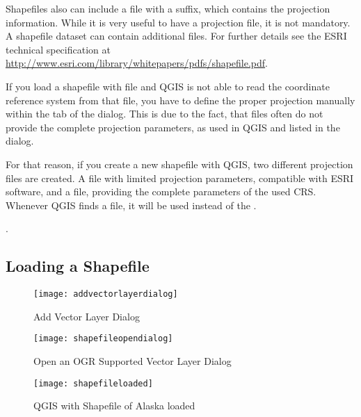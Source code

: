 Shapefiles also can include a file with a  suffix, which contains
the projection information. While it is very useful to have a projection file, it is not mandatory. A shapefile dataset can contain additional files. For further details see the ESRI technical specification at \url{http://www.esri.com/library/whitepapers/pdfs/shapefile.pdf}.


If you load a shapefile with  file and QGIS is not 
able to read the coordinate reference system from that file, you have to define the 
proper projection manually within the  tab of the  dialog. This is due to the fact, that  files often  
do not provide the complete projection parameters, as used in QGIS and listed in 
the  dialog. 

For that reason, if you create a new shapefile with QGIS, two different projection 
files are created. A  file with limited projection parameters, 
compatible with ESRI software, and a  file, providing the complete 
parameters of the used CRS. Whenever QGIS finds a  file, it will be 
used instead of the .   

.

\subsection{Loading a Shapefile}\label{sec:load_shapefile}

\begin{figure}[ht]
   \begin{center}
   \caption{Add Vector Layer Dialog \nixcaption}\label{fig:addvectorlayer}\smallskip
   \texttt{[image: addvectorlayerdialog]}
\end{center} 
\end{figure}

\begin{figure}[ht]
   \begin{center}
   \caption{Open an OGR Supported Vector Layer Dialog \nixcaption}\label{fig:openshapefile}\smallskip
   \texttt{[image: shapefileopendialog]}
\end{center} 
\end{figure}

\begin{figure}[ht]
   \begin{center}
   \caption{QGIS with Shapefile of Alaska loaded \nixcaption}\label{fig:loadedshapefile}\smallskip
   \texttt{[image: shapefileloaded]}
\end{center} 
\end{figure}


